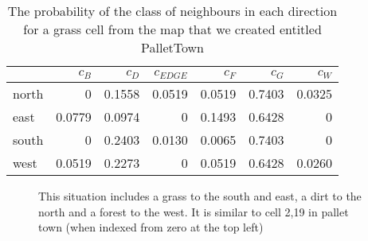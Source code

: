 \begin{table}[h]
\small
\begin{center}
\begin{tabular}{ l | r r r r r r }
              & $c_{B}$& $c_{D}$& $c_{EDGE}$& $c_{F}$& $c_{G}$& $c_{W}$ \\ 
              \hline
    north     & 0      & 0.1558 & 0.0519    & 0.0519 & 0.7403 & 0.0325\\
    east      & 0.0779 & 0.0974 & 0         & 0.1493 & 0.6428 & 0\\
    south     & 0      & 0.2403 & 0.0130    & 0.0065 & 0.7403 & 0\\
    west      & 0.0519 & 0.2273 & 0         & 0.0519 & 0.6428 & 0.0260\\
\end{tabular}
\caption{The probability of the class of neighbours in each direction for a
    grass cell from the map that we created entitled PalletTown} 
\end{center}
\end{table}

\begin{figure}[h]
\begin{center}
\end{center}
\caption{This situation includes a grass to the south and east, a dirt to the
    north and a forest to the west. It is similar to cell 2,19 in pallet town
    (when indexed from zero at the top left)}
\end{figure}
